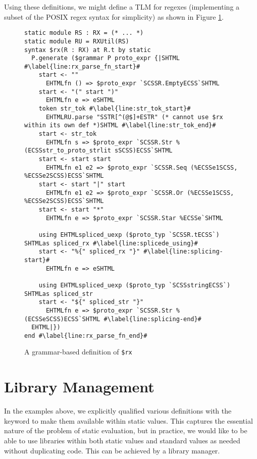 {Using these definitions, we might define a TLM for regexes (implementing a subset of the POSIX regex syntax for simplicity) as shown in Figure \ref{fig:rx-grammar-based}.

\begin{figure}[h!]
\vspace{-5px}
\begin{lstlisting}[deletekeywords={as}]
static module RS : RX = (* ... *)
static module RU = RXUtil(RS)
syntax $rx(R : RX) at R.t by static 
  P.generate ($grammar P proto_expr {|SHTML #\label{line:rx_parse_fn_start}#
    start <- ""
      EHTMLfn () => $proto_expr `SCSSR.EmptyECSS`SHTML
    start <- "(" start ")"
      EHTMLfn e => eSHTML
    token str_tok #\label{line:str_tok_start}#
      EHTMLRU.parse "SSTR[^(@$]+ESTR" (* cannot use $rx within its own def *)SHTML #\label{line:str_tok_end}#
    start <- str_tok
      EHTMLfn s => $proto_expr `SCSSR.Str %(ECSSstr_to_proto_strlit sSCSS)ECSS`SHTML
    start <- start start
      EHTMLfn e1 e2 => $proto_expr `SCSSR.Seq (%ECSSe1SCSS, %ECSSe2SCSS)ECSS`SHTML
    start <- start "|" start 
      EHTMLfn e1 e2 => $proto_expr `SCSSR.Or (%ECSSe1SCSS, %ECSSe2SCSS)ECSS`SHTML
    start <- start "*"
      EHTMLfn e => $proto_expr `SCSSR.Star %ECSSe`SHTML

    using EHTMLspliced_uexp ($proto_typ `SCSSR.tECSS`) SHTMLas spliced_rx #\label{line:splicede_using}#
    start <- "%{" spliced_rx "}" #\label{line:splicing-start}#
      EHTMLfn e => eSHTML

    using EHTMLspliced_uexp ($proto_typ `SCSSstringECSS`) SHTMLas spliced_str
    start <- "${" spliced_str "}"
      EHTMLfn e => $proto_expr `SCSSR.Str %(ECSSeSCSS)ECSS`SHTML #\label{line:splicing-end}#
  EHTML|})
end #\label{line:rx_parse_fn_end}#
\end{lstlisting}
\vspace{-12px}
\caption{A grammar-based definition of \texttt{\$rx}}
\vspace{-15px}
\label{fig:rx-grammar-based}
\end{figure}


\section{Library Management}
In the examples above, we explicitly qualified various definitions with the  keyword to make them available within static values. This captures the essential nature of the problem of static evaluation, but in practice, we would like to be able to use libraries within both static values and standard values as needed without duplicating code. This can be achieved by a library manager.

}

